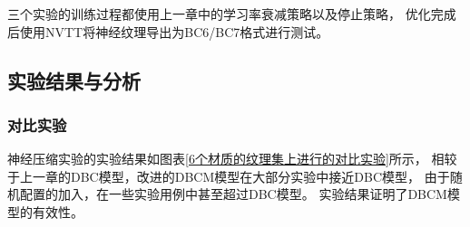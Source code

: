 三个实验的训练过程都使用上一章中的学习率衰减策略以及停止策略，
优化完成后使用NVTT将神经纹理导出为BC6/BC7格式进行测试。

\subsection{实验结果与分析}

\subsubsection{对比实验}
\label{3:对比实验}

神经压缩实验的实验结果如图表\ref{6个材质的纹理集上进行的对比实验}所示，
相较于上一章的DBC模型，改进的DBCM模型在大部分实验中接近DBC模型，
由于随机配置的加入，在一些实验用例中甚至超过DBC模型。
实验结果证明了DBCM模型的有效性。


